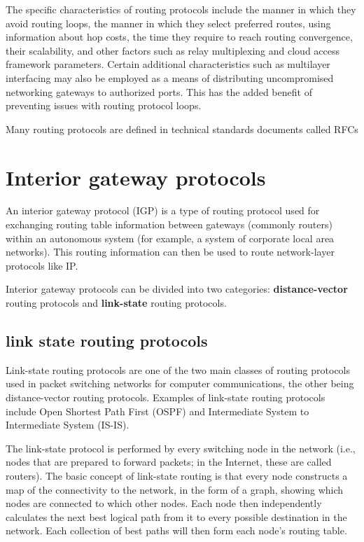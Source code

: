 \documentclass[a4paper,12pt]{article}
\begin{document}
The specific characteristics of routing protocols include the manner in which they avoid routing loops, the manner in which they select preferred routes, using information about hop costs, the time they require to reach routing convergence, their scalability, and other factors such as relay multiplexing and cloud access framework parameters. Certain additional characteristics such as multilayer interfacing may also be employed as a means of distributing uncompromised networking gateways to authorized ports. This has the added benefit of preventing issues with routing protocol loops.

Many routing protocols are defined in technical standards documents called RFCs

\section{Interior gateway protocols}
An interior gateway protocol (IGP) is a type of routing protocol used for exchanging routing table information between gateways (commonly routers) within an autonomous system (for example, a system of corporate local area networks). This routing information can then be used to route network-layer protocols like IP.

Interior gateway protocols can be divided into two categories: \textbf{distance-vector} routing protocols and \textbf{link-state} routing protocols.

\subsection{link state routing protocols}
Link-state routing protocols are one of the two main classes of routing protocols used in packet switching networks for computer communications, the other being distance-vector routing protocols. Examples of link-state routing protocols include Open Shortest Path First (OSPF) and Intermediate System to Intermediate System (IS-IS).

The link-state protocol is performed by every switching node in the network (i.e., nodes that are prepared to forward packets; in the Internet, these are called routers). The basic concept of link-state routing is that every node constructs a map of the connectivity to the network, in the form of a graph, showing which nodes are connected to which other nodes. Each node then independently calculates the next best logical path from it to every possible destination in the network. Each collection of best paths will then form each node's routing table.
\end{document}
